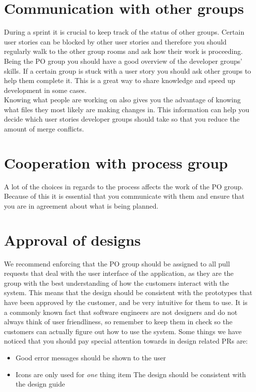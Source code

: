 \section{Communication with other groups}
During a sprint it is crucial to keep track of the status of other groups.
Certain user stories can be blocked by other user stories and therefore you should regularly walk to the other group rooms and ask how their work is proceeding.
\\
Being the PO group you should have a good overview of the developer groups' skills.
If a certain group is stuck with a user story you should ask other groups to help them complete it.
This is a great way to share knowledge and speed up development in some cases.
\\
Knowing what people are working on also gives you the advantage of knowing what files they most likely are making changes in.
This information can help you decide which user stories developer groups should take so that you reduce the amount of merge conflicts.


\section{Cooperation with process group}
A lot of the choices in regards to the process affects the work of the PO group.
Because of this it is essential that you communicate with them and ensure that you are in agreement about what is being planned.

\section{Approval of designs}
We recommend enforcing that the PO group should be assigned to all pull requests that deal with the user interface of the application, as they are the group with the best understanding of how the customers interact with the system.
This means that the design should be consistent with the prototypes that have been approved by the customer, and be very intuitive for them to use.
It is a commonly known fact that software engineers are not designers and do not always think of user friendliness, so remember to keep them in check so the customers can actually figure out how to use the system.
Some things we have noticed that you should pay special attention towards in design related PRs are: 
\begin{itemize}
    \item Good error messages should be shown to the user
    \item Icons are only used for \textit{one} thing
    item The design should be consistent with the design guide
\end{itemize}

